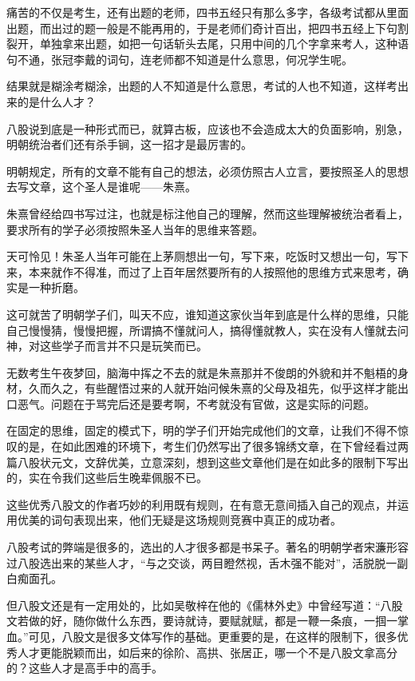 \begin{multicols}{\theparacolNo}
		痛苦的不仅是考生，还有出题的老师，四书五经只有那么多字，各级考试都从里面出题，而出过的题一般是不能再用的，于是老师们奇计百出，把四书五经上下句割裂开，单独拿来出题，如把一句话斩头去尾，只用中间的几个字拿来考人，这种语句不通，张冠李戴的词句，连老师都不知道是什么意思，何况学生呢。

		结果就是糊涂考糊涂，出题的人不知道是什么意思，考试的人也不知道，这样考出来的是什么人才？

		八股说到底是一种形式而已，就算古板，应该也不会造成太大的负面影响，别急，明朝统治者们还有杀手锏，这一招才是最厉害的。

		明朝规定，所有的文章不能有自己的想法，必须仿照古人立言，要按照圣人的思想去写文章，这个圣人是谁呢——朱熹。

		朱熹曾经给四书写过注，也就是标注他自己的理解，然而这些理解被统治者看上，要求所有的学子必须按照朱圣人当年的思维来答题。

		天可怜见！朱圣人当年可能在上茅厕想出一句，写下来，吃饭时又想出一句，写下来，本来就作不得准，而过了上百年居然要所有的人按照他的思维方式来思考，确实是一种折磨。

		这可就苦了明朝学子们，叫天不应，谁知道这家伙当年到底是什么样的思维，只能自己慢慢猜，慢慢把握，所谓搞不懂就问人，搞得懂就教人，实在没有人懂就去问神，对这些学子而言并不只是玩笑而已。

		无数考生午夜梦回，脑海中挥之不去的就是朱熹那并不俊朗的外貌和并不魁梧的身材，久而久之，有些醒悟过来的人就开始问候朱熹的父母及祖先，似乎这样才能出口恶气。问题在于骂完后还是要考啊，不考就没有官做，这是实际的问题。

		在固定的思维，固定的模式下，明的学子们开始完成他们的文章，让我们不得不惊叹的是，在如此困难的环境下，考生们仍然写出了很多锦绣文章，在下曾经看过两篇八股状元文，文辞优美，立意深刻，想到这些文章他们是在如此多的限制下写出的，实在令我们这些后生晚辈佩服不已。

		这些优秀八股文的作者巧妙的利用既有规则，在有意无意间插入自己的观点，并运用优美的词句表现出来，他们无疑是这场规则竞赛中真正的成功者。

		八股考试的弊端是很多的，选出的人才很多都是书呆子。著名的明朝学者宋濂形容过八股选出来的某些人才，“与之交谈，两目瞪然视，舌木强不能对”，活脱脱一副白痴面孔。

		但八股文还是有一定用处的，比如吴敬梓在他的《儒林外史》中曾经写道：“八股文若做的好，随你做什么东西，要诗就诗，要赋就赋，都是一鞭一条痕，一掴一掌血。”可见，八股文是很多文体写作的基础。更重要的是，在这样的限制下，很多优秀人才更能脱颖而出，如后来的徐阶、高拱、张居正，哪一个不是八股文拿高分的？这些人才是高手中的高手。


\end{multicols}
